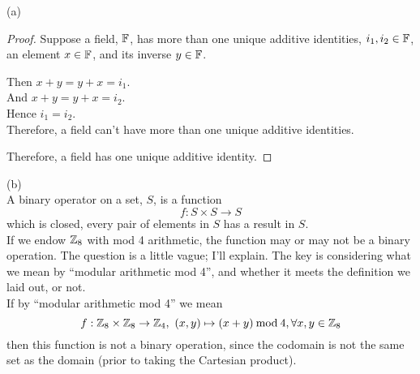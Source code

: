 \documentclass[a4paper,12pt]{report}
\begin{document}
\newpage
{}
\sol (a)
\begin{proof}
	Suppose a field, $\mathbb{F}$, has more than one unique additive identities, $i_1, i_2\in\mathbb{F}$, an element $x\in\mathbb{F}$, and its inverse $y\in\mathbb{F}$. 
	\begin{list}{}{\setlength{\leftmargin}{1in}\setlength{\topsep}{0pt}}\item
		Then $x + y = y + x = i_1$. \\
		And $x + y = y + x = i_2$. \\
		Hence $i_1 = i_2$. \CONTRA \\
		Therefore, a field can't have more than one unique additive identities.
	\end{list}
	Therefore, a field has one unique additive identity.
\end{proof}

\sol (b) \\
A binary operator on a set, $S$, is a function
$$
	f:S\times S\to S
$$
which is closed, every pair of elements in $S$ has a result in $S$. \\

If we endow $\mathbb{Z}_8$ with mod 4 arithmetic, the function may or may not be a binary operation. The question is a little vague; I'll explain. The key is considering what we mean by ``modular arithmetic mod 4'', and whether it meets the definition we laid out, or not. \\

If by ``modular arithmetic mod 4'' we mean
$$
	f:\mathbb{Z}_8\times\mathbb{Z}_8\to\mathbb{Z}_4,\ (x,y)\mapsto (x+y)\mathbin{\mathrm{mod}}{4}, \forall x,y\in\mathbb{Z}_8
$$
then this function is not a binary operation, since the codomain is not the same set as the domain (prior to taking the Cartesian product). \\
\end{document}
